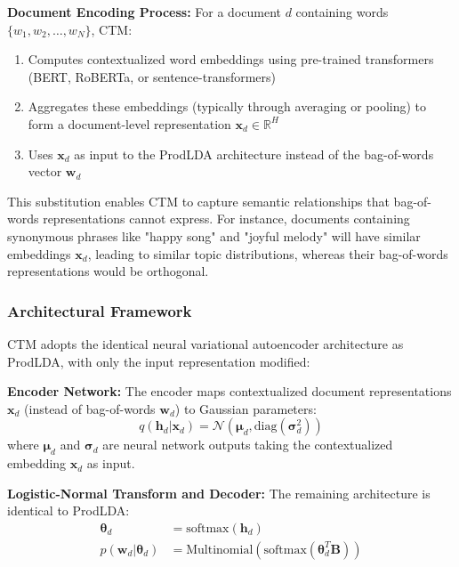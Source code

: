 \documentclass[12pt]{article}
\begin{document}
\textbf{Document Encoding Process:} For a document $d$ containing words $\{w_1, w_2, \ldots, w_N\}$, CTM:
\begin{enumerate}
    \item Computes contextualized word embeddings using pre-trained transformers (BERT,
          RoBERTa, or sentence-transformers)
    \item Aggregates these embeddings (typically through averaging or pooling) to form a
          document-level representation $\mathbf{x}_d \in \mathbb{R}^H$
    \item Uses $\mathbf{x}_d$ as input to the ProdLDA architecture instead of the
          bag-of-words vector $\mathbf{w}_d$
\end{enumerate}

This substitution enables CTM to capture semantic relationships that
bag-of-words representations cannot express. For instance, documents containing
synonymous phrases like "happy song" and "joyful melody" will have similar
embeddings $\mathbf{x}_d$, leading to similar topic distributions, whereas
their bag-of-words representations would be orthogonal.

\subsubsection{Architectural Framework}
CTM adopts the identical neural variational autoencoder architecture as
ProdLDA, with only the input representation modified:

\textbf{Encoder Network:} The encoder maps contextualized document representations $\mathbf{x}_d$ (instead of bag-of-words $\mathbf{w}_d$) to Gaussian parameters:
\begin{equation}
    q(\mathbf{h}_d | \mathbf{x}_d) = \mathcal{N}(\boldsymbol{\mu}_d, \text{diag}(\boldsymbol{\sigma}_d^2))
\end{equation}
where $\boldsymbol{\mu}_d$ and $\boldsymbol{\sigma}_d$ are neural network outputs taking the contextualized embedding $\mathbf{x}_d$ as input.

\textbf{Logistic-Normal Transform and Decoder:} The remaining architecture is identical to ProdLDA:
\begin{align}
    \boldsymbol{\theta}_d                   & = \text{softmax}(\mathbf{h}_d)                                           \\
    p(\mathbf{w}_d | \boldsymbol{\theta}_d) & = \text{Multinomial}(\text{softmax}(\boldsymbol{\theta}_d^T \mathbf{B}))
\end{align}
\end{document}
